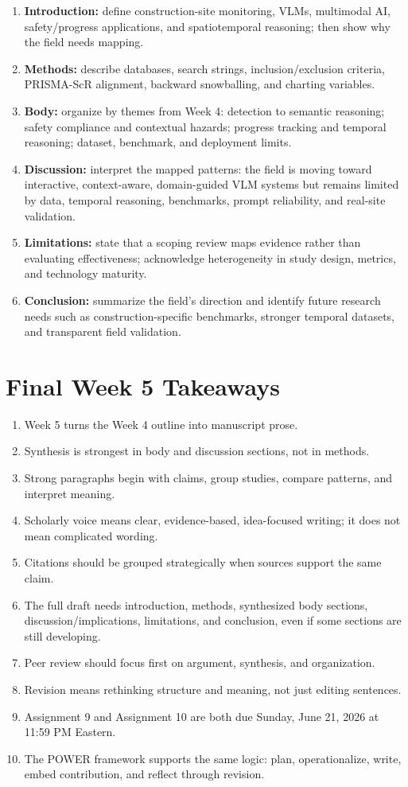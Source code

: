 \documentclass[10pt,letterpaper]{article}
\begin{document}
\begin{enumerate}
\item \textbf{Introduction:} define construction-site monitoring, VLMs, multimodal AI, safety/progress applications, and spatiotemporal reasoning; then show why the field needs mapping.
\item \textbf{Methods:} describe databases, search strings, inclusion/exclusion criteria, PRISMA-ScR alignment, backward snowballing, and charting variables.
\item \textbf{Body:} organize by themes from Week 4: detection to semantic reasoning; safety compliance and contextual hazards; progress tracking and temporal reasoning; dataset, benchmark, and deployment limits.
\item \textbf{Discussion:} interpret the mapped patterns: the field is moving toward interactive, context-aware, domain-guided VLM systems but remains limited by data, temporal reasoning, benchmarks, prompt reliability, and real-site validation.
\item \textbf{Limitations:} state that a scoping review maps evidence rather than evaluating effectiveness; acknowledge heterogeneity in study design, metrics, and technology maturity.
\item \textbf{Conclusion:} summarize the field's direction and identify future research needs such as construction-specific benchmarks, stronger temporal datasets, and transparent field validation.
\end{enumerate}

\section{Final Week 5 Takeaways}

\begin{enumerate}
\item Week 5 turns the Week 4 outline into manuscript prose.
\item Synthesis is strongest in body and discussion sections, not in methods.
\item Strong paragraphs begin with claims, group studies, compare patterns, and interpret meaning.
\item Scholarly voice means clear, evidence-based, idea-focused writing; it does not mean complicated wording.
\item Citations should be grouped strategically when sources support the same claim.
\item The full draft needs introduction, methods, synthesized body sections, discussion/implications, limitations, and conclusion, even if some sections are still developing.
\item Peer review should focus first on argument, synthesis, and organization.
\item Revision means rethinking structure and meaning, not just editing sentences.
\item Assignment 9 and Assignment 10 are both due Sunday, June 21, 2026 at 11:59 PM Eastern.
\item The POWER framework supports the same logic: plan, operationalize, write, embed contribution, and reflect through revision.
\end{enumerate}
\end{document}
